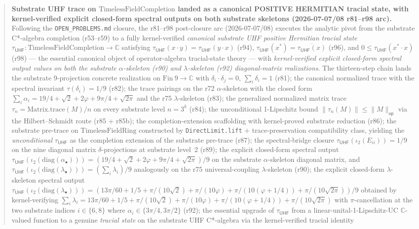 \documentclass[11pt,a4paper]{amsart}
\theoremstyle{plain}
\theoremstyle{definition}
\begin{document}
\begin{abstract}
\textbf{Substrate UHF trace on $\text{TimelessFieldCompletion}$ landed as a canonical POSITIVE HERMITIAN tracial state, with kernel-verified explicit closed-form spectral outputs on both substrate skeletons (2026-07-07/08 r81--r98 arc).} Following the \texttt{OPEN\_PROBLEMS.md} closure, the r81--r98 post-closure arc (2026-07-07/08) executes the analytic pivot from the substrate C*-algebra completion (r53--r59) to a fully kernel-verified \emph{canonical substrate UHF positive Hermitian tracial state} $\tau_{\textsf{UHF}} \colon \text{TimelessFieldCompletion} \to \mathbb{C}$ satisfying $\tau_{\textsf{UHF}}(x \cdot y) = \tau_{\textsf{UHF}}(y \cdot x)$ (r94), $\tau_{\textsf{UHF}}(x^*) = \overline{\tau_{\textsf{UHF}}(x)}$ (r96), and $0 \le \tau_{\textsf{UHF}}(x^* \cdot x)$ (r98) --- the essential canonical object of operator-algebra tracial-state theory --- with \emph{kernel-verified explicit closed-form spectral output values on both the substrate $\alpha$-skeleton (r90) and $\lambda$-skeleton (r92) diagonal-matrix realizations}. The thirteen-step chain lands the substrate 9-projection concrete realization on $\mathrm{Fin}~9 \to \mathbb{C}$ with $\delta_i \cdot \delta_j = 0$, $\sum_i \delta_i = 1$ (r81); the canonical normalized trace with the spectral invariant $\tau(\delta_i) = 1/9$ (r82); the trace pairings on the r72 $\alpha$-skeleton with the closed form $\sum_i \alpha_i = 19/4 + \sqrt{2} + 2\varphi + 9\pi/4 + \sqrt{2\pi}$ and the r75 $\lambda$-skeleton (r83); the generalized normalized matrix trace $\tau_n = \mathrm{Matrix.trace}(M)/n$ on every substrate level $n = 3^k$ (r84); the unconditional 1-Lipschitz bound $\|\tau_n(M)\| \le \|M\|_{\textsf{op}}$ via the Hilbert--Schmidt route (r85 + r85b); the completion-extension scaffolding with kernel-proved substrate reduction (r86); the substrate pre-trace on $\mathrm{TimelessFieldRing}$ constructed by \texttt{DirectLimit.lift} $+$ trace-preservation compatibility class, yielding the \emph{unconditional} $\tau_{\textsf{UHF}}$ as the completion extension of the substrate pre-trace (r87); the spectral-bridge closure $\tau_{\textsf{UHF}}(\iota_2(E_{ii})) = 1/9$ on the nine diagonal matrix $\delta$-projections at substrate level~2 (r89); the explicit closed-form spectral output $\tau_{\textsf{UHF}}(\iota_2(\mathrm{diag}(\alpha_{\bullet}))) = (19/4 + \sqrt{2} + 2\varphi + 9\pi/4 + \sqrt{2\pi})/9$ on the substrate $\alpha$-skeleton diagonal matrix, and $\tau_{\textsf{UHF}}(\iota_2(\mathrm{diag}(\lambda_{\bullet}))) = (\sum_i \lambda_i)/9$ analogously on the r75 universal-coupling $\lambda$-skeleton (r90); the explicit closed-form $\lambda$-skeleton spectral output $\tau_{\textsf{UHF}}(\iota_2(\mathrm{diag}(\lambda_{\bullet}))) = (13\pi/60 + 1/5 + \pi/(10\sqrt{2}) + \pi/(10\varphi) + \pi/(10(\varphi+1/4)) + \pi/(10\sqrt{2\pi}))/9$ obtained by kernel-verifying $\sum_i \lambda_i = 13\pi/60 + 1/5 + \pi/(10\sqrt{2}) + \pi/(10\varphi) + \pi/(10(\varphi+1/4)) + \pi/(10\sqrt{2\pi})$ with $\pi$-cancellation at the two substrate indices $i \in \{6, 8\}$ where $\alpha_i \in \{3\pi/4, 3\pi/2\}$ (r92); the essential upgrade of $\tau_{\textsf{UHF}}$ from a linear-unital-1-Lipschitz-UC $\mathbb{C}$-valued function to a genuine \emph{tracial state} on the substrate UHF C*-algebra via the kernel-verified tracial identity 
\end{abstract}
\end{document}
